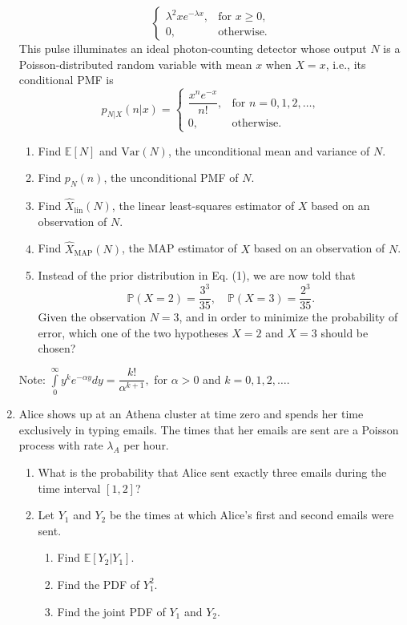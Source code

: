 \documentclass[a4paper,9pt,landscape]{extarticle}
\newcommand{\var}{\textrm{Var}}
\begin{document}
\begin{multicols*}{3}
\begin{enumerate}
\begin{equation}
\begin{cases}
		\lambda^2xe^{-\lambda x},&\text{for }x\geq0,\\
		0,&\text{otherwise.}
		\end{cases}
	\end{equation}
	This pulse illuminates an ideal photon-counting detector whose output $N$ is a Poisson-distributed random variable with mean $x$ when $X=x$, i.e., its conditional PMF is
	$$p_{N|X}(n|x)=\begin{cases}
		\dfrac{x^ne^{-x}}{n!},&\text{for }n=0,1,2,\dots,\\
		0,&\text{otherwise.}
	\end{cases}$$
	\begin{enumerate}
		\item Find $\mathds{E}\left[N\right]$ and $\var(N)$, the unconditional mean and variance of $N$.
		\item Find $p_N(n)$, the unconditional PMF of $N$.
		\item Find $\widehat{X}_\text{lin}(N)$, the linear least-squares estimator of $X$ based on an observation of $N$.
		\item Find $\widehat{X}_\text{MAP}(N)$, the MAP estimator of $X$ based on an observation of $N$.
		\item Instead of the prior distribution in Eq. (1), we are now told that
		$$\mathds{P}(X=2)=\frac{3^3}{35},\quad\mathds{P}(X=3)=\frac{2^3}{35}.$$ Given the observation $N=3$, and in order to minimize the probability of error, which one of the two hypotheses $X=2$ and $X=3$ should be chosen?
	\end{enumerate}
	Note: $\int\limits_{0}^{\infty}y^ke^{-\alpha y}dy=\dfrac{k!}{\alpha^{k+1}},$ for $\alpha>0$ and $k=0,1,2,\dots.$
	\item Alice shows up at an Athena cluster at time zero and spends her time exclusively in typing emails. The times that her emails are sent are a Poisson process with rate $\lambda_A$ per hour.
	\begin{enumerate}
		\item What is the probability that Alice sent exactly three emails during the time interval $[1,2]$?
		\item Let $Y_1$ and $Y_2$ be the times at which Alice's first and second emails were sent.
		\begin{enumerate}
			\item Find $\mathds{E}\left[Y_2|Y_1\right]$.
			\item Find the PDF of $Y_1^2$.
			\item Find the joint PDF of $Y_1$ and $Y_2$.

\end{enumerate}
\end{enumerate}
\end{enumerate}
\end{multicols*}
\end{document}
